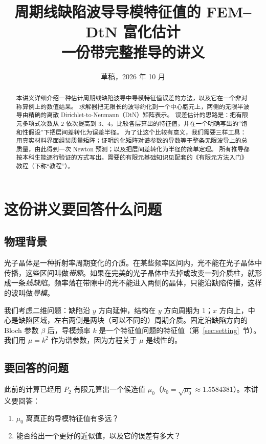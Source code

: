 \documentclass[11pt,a4paper,fontset=fandol]{ctexart}
\title{周期线缺陷波导导模特征值的 FEM--DtN 富化估计\\[2pt]\large 一份带完整推导的讲义}
\author{}
\date{草稿，2026 年 10 月}
\begin{document}
\maketitle

\begin{abstract}
本讲义详细介绍一种估计周期线缺陷波导中导模特征值误差的方法，以及它在一个非对称算例上的数值结果。
求解器把无限长的波导约化到一个中心胞元上，两侧的无限半波导由精确的离散 Dirichlet-to-Neumann（DtN）矩阵表示。
误差估计的思路是：把有限元多项式次数从 2 依次提高到 3、4，比较各层算出的特征值，并在一个明确写出的“饱和性假设”下把层间差转化为误差半径。
为了让这个比较有意义，我们需要三样工具：用真实材料界面组装质量矩阵；证明约化矩阵对谱参数的导数等于整条无限波导上的总质量，由此得到一次 Newton 预测；以及把层间差转化为半径的简单定理。
所有推导都按本科生能逐行验证的方式写出。需要的有限元基础知识见配套的《有限元方法入门》教程（下称“教程”）。
\end{abstract}

\tableofcontents

\section{这份讲义要回答什么问题}
\label{sec:intro}

\subsection{物理背景}

光子晶体是一种折射率周期变化的介质。在某些频率区间内，光不能在光子晶体中传播，这些区间叫做\emph{带隙}。如果在完美的光子晶体中去掉或改变一列介质柱，就形成一条\emph{线缺陷}。频率落在带隙中的光不能进入两侧的晶体，只能沿缺陷传播，这样的波叫做\emph{导模}\citep{JoannopoulosJohnsonWinnMeade2008}。

我们考虑二维问题：缺陷沿 $y$ 方向延伸，结构在 $y$ 方向周期为 1；$x$ 方向上，中心是缺陷区域，左右两侧是两块（可以不同的）周期介质。固定沿缺陷方向的 Bloch 参数 $\beta$ 后，导模频率 $k$ 是一个特征值问题的特征值（第~\ref{sec:setting}~节）。我们用 $\mu=k^2$ 作为谱参数，因为方程关于 $\mu$ 是线性的。

\subsection{要回答的问题}

此前的计算已经用 $P_2$ 有限元算出一个候选值 $\mu_0$（$k_0=\sqrt{\mu_0}\approx1.5584381$）。本讲义要回答：
\begin{enumerate}
\item $\mu_0$ 离真正的导模特征值有多远？
\item 能否给出一个更好的近似值，以及它的误差有多大？
\end{enumerate}
\end{document}
